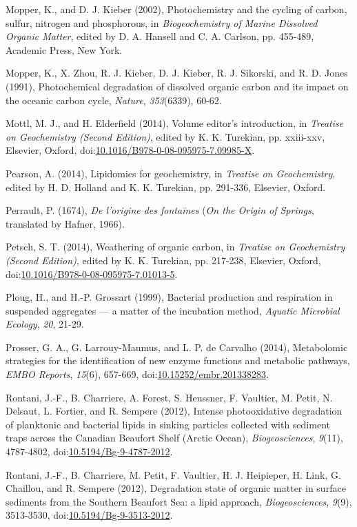 \begin{singlespace}
{{Mopper, K., and D. J. Kieber (2002), Photochemistry and the cycling of
carbon, sulfur, nitrogen and phosphorous, in \emph{Biogeochemistry of
Marine Dissolved Organic Matter}, edited by D. A. Hansell and C. A.
Carlson, pp. 455-489, Academic Press, New York.

Mopper, K., X. Zhou, R. J. Kieber, D. J. Kieber, R. J. Sikorski, and R.
D. Jones (1991), Photochemical degradation of dissolved organic carbon
and its impact on the oceanic carbon cycle, \emph{Nature},
\emph{353}(6339), 60-62.

Mottl, M. J., and H. Elderfield (2014), Volume editor's introduction, in \emph{Treatise on Geochemistry (Second Edition)}, edited by K. K. Turekian, pp. xxiii-xxv, Elsevier, Oxford, doi:\href{http://dx.doi.org/10.1016/B978-0-08-095975-7.09985-X}{10.1016/B978-0-08-095975-7.09985-X}.

Pearson, A. (2014), Lipidomics for geochemistry, in \emph{Treatise on
Geochemistry}, edited by H. D. Holland and K. K. Turekian, pp. 291-336,
Elsevier, Oxford.

Perrault, P. (1674), \emph{De l'origine des fontaines} (\emph{On the Origin of Springs}, translated by Hafner, 1966).

Petsch, S. T. (2014), Weathering of organic carbon, in \emph{Treatise on
Geochemistry (Second Edition)}, edited by K. K. Turekian, pp. 217-238,
Elsevier, Oxford, doi:\href{http://dx.doi.org/10.1016/B978-0-08-095975-7.01013-5}{10.1016/B978-0-08-095975-7.01013-5}.

Ploug, H., and H.-P. Grossart (1999), Bacterial production and
respiration in suspended aggregates --- a matter of the incubation
method, \emph{Aquatic Microbial Ecology}, \emph{20}, 21-29.

Prosser, G. A., G. Larrouy-Maumus, and L. P. de Carvalho (2014),
Metabolomic strategies for the identification of new enzyme functions
and metabolic pathways, \emph{EMBO Reports}, \emph{15}(6), 657-669,
doi:\href{http://dx.doi.org/10.15252/embr.201338283}{10.15252/embr.201338283}.

Rontani, J.-F., B. Charriere, A. Forest, S. Heussner, F. Vaultier, M.
Petit, N. Delsaut, L. Fortier, and R. Sempere (2012), Intense
photooxidative degradation of planktonic and bacterial lipids in sinking
particles collected with sediment traps across the Canadian Beaufort
Shelf (Arctic Ocean), \emph{Biogeosciences}, \emph{9}(11), 4787-4802,
doi:\href{http://dx.doi.org/10.5194/Bg-9-4787-2012}{10.5194/Bg-9-4787-2012}.

Rontani, J.-F., B. Charriere, M. Petit, F. Vaultier, H. J. Heipieper, H.
Link, G. Chaillou, and R. Sempere (2012), Degradation state of organic
matter in surface sediments from the Southern Beaufort Sea: a lipid
approach, \emph{Biogeosciences}, \emph{9}(9), 3513-3530,
doi:\href{http://dx.doi.org/10.5194/Bg-9-3513-2012}{10.5194/Bg-9-3513-2012}.

}}
\end{singlespace}
